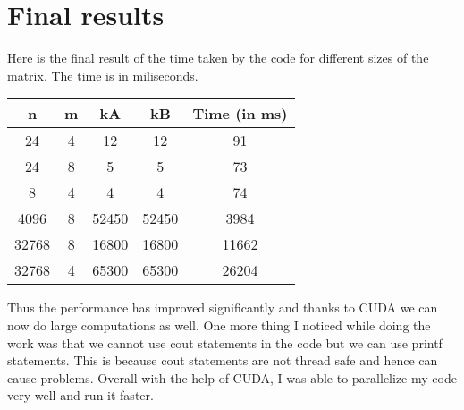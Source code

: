 \documentclass{article}
\begin{document}
\section{Final results}

Here is the final result of the time taken by the code for different sizes of the matrix. The time is in miliseconds.

\begin{table}[H]
    \begin{tabular}{|c|c|c|c|c|}
    \hline
    n     & m & kA    & kB    & Time (in ms) \\ \hline
    24    & 4 & 12    & 12    & 91           \\ \hline
    24    & 8 & 5     & 5     & 73           \\ \hline
    8     & 4 & 4     & 4     & 74           \\ \hline
    4096  & 8 & 52450 & 52450 & 3984         \\ \hline
    32768 & 8 & 16800 & 16800 & 11662        \\ \hline
    32768 & 4 & 65300 & 65300 & 26204        \\ \hline
    \end{tabular}
\end{table}

Thus the performance has improved significantly and thanks to CUDA we can now do large computations as well. One more thing I noticed while doing the work was that we cannot use cout statements in the code but we can use printf statements. This is because cout statements are not thread safe and hence can cause problems. Overall with the help of CUDA, I was able to parallelize my code very well and run it faster.
\end{document}
